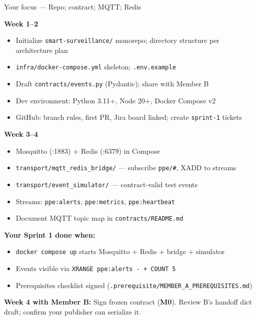 \documentclass[12pt,a4paper]{article}
\begin{document}
\begin{sprintbox}{{Your focus --- Repo; contract; MQTT; Redis}}

\begin{taskbox}
\textbf{Week 1--2}
\begin{itemize}
    \item Initialize \texttt{smart-surveillance/} monorepo; directory structure per architecture plan
    \item \texttt{infra/docker-compose.yml} skeleton; \texttt{.env.example}
    \item Draft \texttt{contracts/events.py} (Pydantic); share with Member B
    \item Dev environment: Python 3.11+, Node 20+, Docker Compose v2
    \item GitHub: branch rules, first PR, Jira board linked; create \texttt{sprint-1} tickets
\end{itemize}
\end{taskbox}

\begin{taskbox}
\textbf{Week 3--4}
\begin{itemize}
    \item Mosquitto (:1883) + Redis (:6379) in Compose
    \item \texttt{transport/mqtt\_redis\_bridge/} --- subscribe \texttt{ppe/\#}, XADD to streams
    \item \texttt{transport/event\_simulator/} --- contract-valid test events
    \item Streams: \texttt{ppe:alerts}, \texttt{ppe:metrics}, \texttt{ppe:heartbeat}
    \item Document MQTT topic map in \texttt{contracts/README.md}
\end{itemize}
\end{taskbox}

\begin{deliverablebox}
\textbf{Your Sprint 1 done when:}
\begin{itemize}
    \item \texttt{docker compose up} starts Mosquitto + Redis + bridge + simulator
    \item Events visible via \texttt{XRANGE ppe:alerts - + COUNT 5}
    \item Prerequisites checklist signed (\texttt{.prerequisite/MEMBER\_A\_PREREQUISITES.md})
\end{itemize}
\end{deliverablebox}

\begin{collabbox}
\textbf{Week 4 with Member B:} Sign frozen contract (\textbf{M0}). Review B's handoff dict draft; confirm your publisher can serialize it.
\end{collabbox}

\end{sprintbox}
\end{document}
